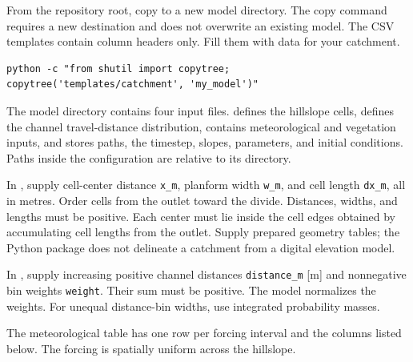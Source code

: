 From the repository root, copy  to a new model directory. The copy command requires a new destination and does not overwrite an existing model. The CSV templates contain column headers only. Fill them with data for your catchment.

\begin{lstlisting}[language={},basicstyle=\ttfamily\footnotesize,caption={Create a model directory from the input template.}]
python -c "from shutil import copytree; copytree('templates/catchment', 'my_model')"
\end{lstlisting}

The model directory contains four input files.  defines the hillslope cells,  defines the channel travel-distance distribution,  contains meteorological and vegetation inputs, and  stores paths, the timestep, slopes, parameters, and initial conditions. Paths inside the configuration are relative to its directory.

In , supply cell-center distance \texttt{x\_m}, planform width \texttt{w\_m}, and cell length \texttt{dx\_m}, all in metres. Order cells from the outlet toward the divide. Distances, widths, and lengths must be positive. Each center must lie inside the cell edges obtained by accumulating cell lengths from the outlet. Supply prepared geometry tables; the Python package does not delineate a catchment from a digital elevation model.

In , supply increasing positive channel distances \texttt{distance\_m} [m] and nonnegative bin weights \texttt{weight}. Their sum must be positive. The model normalizes the weights. For unequal distance-bin widths, use integrated probability masses.

The meteorological table has one row per forcing interval and the columns listed below. The forcing is spatially uniform across the hillslope.

